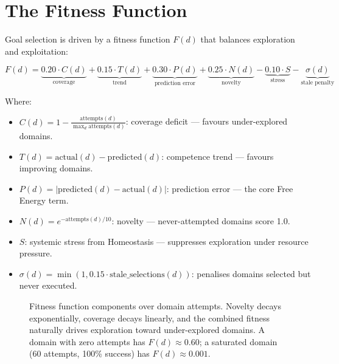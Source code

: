 \documentclass[12pt,a4paper]{report}
\begin{document}
\section{The Fitness Function}
Goal selection is driven by a fitness function $F(d)$ that balances exploration and exploitation:

\begin{equation}
F(d) = \underbrace{0.20 \cdot C(d)}_{\text{coverage}} + \underbrace{0.15 \cdot T(d)}_{\text{trend}} + \underbrace{0.30 \cdot P(d)}_{\text{prediction error}} + \underbrace{0.25 \cdot N(d)}_{\text{novelty}} - \underbrace{0.10 \cdot S}_{\text{stress}} - \underbrace{\sigma(d)}_{\text{stale penalty}}
\label{eq:fitness}
\end{equation}

Where:
\begin{itemize}
    \item $C(d) = 1 - \frac{\text{attempts}(d)}{\max_d \text{attempts}(d)}$: coverage deficit --- favours under-explored domains.
    \item $T(d) = \text{actual}(d) - \text{predicted}(d)$: competence trend --- favours improving domains.
    \item $P(d) = |\text{predicted}(d) - \text{actual}(d)|$: prediction error --- the core Free Energy term.
    \item $N(d) = e^{-\text{attempts}(d)/10}$: novelty --- never-attempted domains score 1.0.
    \item $S$: systemic stress from Homeostasis --- suppresses exploration under resource pressure.
    \item $\sigma(d) = \min(1, 0.15 \cdot \text{stale\_selections}(d))$: penalises domains selected but never executed.
\end{itemize}

\begin{figure}[H]
\centering
{}
\caption{Fitness function components over domain attempts. Novelty decays exponentially, coverage decays linearly, and the combined fitness naturally drives exploration toward under-explored domains. A domain with zero attempts has $F(d) \approx 0.60$; a saturated domain (60 attempts, 100\% success) has $F(d) \approx 0.001$.}
\label{fig:fitness}
\end{figure}
\end{document}
